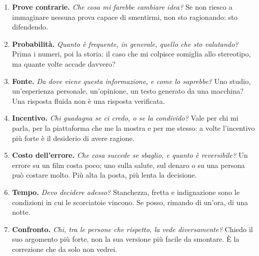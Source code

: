 \begin{enumerate}[label={\sffamily\bfseries\large\arabic*}, leftmargin=2.2em, itemsep=0.9em]
	\item \textbf{Prove contrarie.} \textit{Che cosa mi farebbe cambiare idea?} Se non riesco a immaginare nessuna prova capace di smentirmi, non sto ragionando: sto difendendo.

	\item \textbf{Probabilità.} \textit{Quanto è frequente, in generale, quello che sto valutando?} Prima i numeri, poi la storia: il caso che mi colpisce somiglia allo stereotipo, ma quante volte accade davvero?

	\item \textbf{Fonte.} \textit{Da dove viene questa informazione, e come lo saprebbe?} Uno studio, un'esperienza personale, un'opinione, un testo generato da una macchina? Una risposta fluida non è una risposta verificata.

	\item \textbf{Incentivo.} \textit{Chi guadagna se ci credo, o se la condivido?} Vale per chi mi parla, per la piattaforma che me la mostra e per me stesso: a volte l'incentivo più forte è il desiderio di avere ragione.

	\item \textbf{Costo dell'errore.} \textit{Che cosa succede se sbaglio, e quanto è reversibile?} Un errore su un film costa poco; uno sulla salute, sul denaro o su una persona può costare molto. Più alta la posta, più lenta la decisione.

	\item \textbf{Tempo.} \textit{Devo decidere adesso?} Stanchezza, fretta e indignazione sono le condizioni in cui le scorciatoie vincono. Se posso, rimando di un'ora, di una notte.

	\item \textbf{Confronto.} \textit{Chi, tra le persone che rispetto, la vede diversamente?} Chiedo il suo argomento più forte, non la sua versione più facile da smontare. È la correzione che da solo non vedrei.
\end{enumerate}

